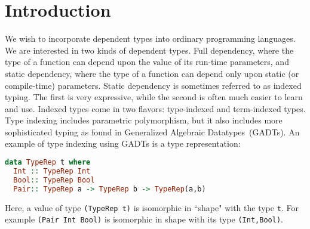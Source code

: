 \section{Introduction}
\label{sec:intro}



We wish to incorporate dependent types into ordinary programming
languages. We are interested in two kinds of dependent types.
Full dependency, where the type of a function can depend upon the value
of its run-time parameters, and static dependency, where the type
of a function can depend only upon static (or compile-time) parameters.
Static dependency is sometimes referred to as indexed typing. The first
is very expressive, while the second is often much easier to learn and 
use. Indexed types come in two flavors: type-indexed and term-indexed
types. Type indexing includes parametric polymorphism, but it also includes
more sophisticated typing as found in Generalized Algebraic Datatypes~(GADTs).
An example of type indexing using GADTs is a type representation:\vspace*{-1pt}
\begin{lstlisting}[basicstyle={\ttfamily\small},language=Haskell,mathescape]
data TypeRep t where
  Int :: TypeRep Int
  Bool:: TypeRep Bool
  Pair:: TypeRep a -> TypeRep b -> TypeRep(a,b)
\end{lstlisting}\vspace*{-1pt}
Here, a value of type {\tt (TypeRep t)} is isomorphic in ``shape" with
the type {\tt t}. For example {\tt (Pair Int Bool)} is isomorphic in shape
with its type {\tt (Int,Bool)}.

